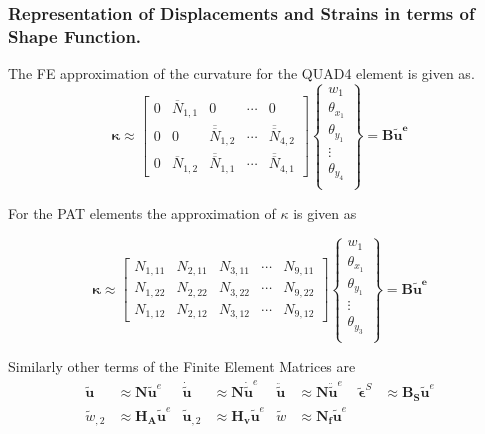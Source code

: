 \documentclass[9pt]{beamer}
\newcommand{\vect}[1]{\boldsymbol{#1}}
\begin{document}
\begin{frame}
\frametitle{Representation of Displacements and Strains in terms of Shape Function.}
The FE approximation of the curvature for the QUAD4 element is given as.
\begin{equation*}\label{eq:kappa}
\vect{ \kappa }  \approx
\begin{bmatrix}
0 & \overline{N}_{1,1} & 0 & \cdots & 0 \\
0&  0 & \overline{\overline{N}}_{1,2}  & \cdots & \overline{\overline{N}}_{4,2} 
\\
0&  \overline{N}_{1,2} & \overline{\overline{N}}_{1,1}  & \cdots & \overline{\overline{N}}_{4,1} 
\end{bmatrix} 
\left\{
\begin{array}{r}
w_1 \\
\theta_{x_1} \\
\theta_{y_1} \\
\vdots \\
\theta_{y_{4}} \\
\end{array} \right\}=\mathbf{ B } \mathbf{\tilde{u}^e}
\end{equation*}


For the PAT elements the approximation of $\kappa$ is given as


\begin{equation*}\label{eq:kappa_KR}
\vect{ \kappa }   \approx
\begin{bmatrix}
N_{1,11} & N_{2,11} & N_{3,11} & \cdots & N_{9,11} \\
N_{1,22} & N_{2,22} & N_{3,22} & \cdots & N_{9,22} \\
N_{1,12} & N_{2,12} & N_{3,12} & \cdots & N_{9,12} 
\end{bmatrix} 
\left\{
\begin{array}{r}
w_1 \\
\theta_{x_1} \\
\theta_{y_1} \\
\vdots \\
\theta_{y_{3}} \\
\end{array} \right\}=\mathbf{ B } \mathbf{\tilde{u}^e}
\end{equation*}


 
Similarly other terms of the Finite Element Matrices are
\begin{align*}
\tilde{ \mathbf{ u}}  & \approx  \mathbf{N}  \tilde{\mathbf{u}}^e
&
\dot{\tilde{ \mathbf{ u}} } & \approx  \mathbf{N}  \dot{\tilde{\mathbf{u}}}^e
&  
\ddot{\tilde{ \mathbf{ u}} } &  \approx   \mathbf{N}  \ddot{\tilde{\mathbf{u}}}^e
&
\tilde{\mathbf{\epsilon}}^S  & \approx  \mathbf{ B_S }\tilde{\mathbf{u}}^e
\\
\tilde{w}_{, 2}  & \approx  \mathbf{ H_A }\tilde{\mathbf{u}}^e
&
\tilde{ \mathbf{ u}}_{,2}  & \approx  \mathbf{ H_v }\tilde{\mathbf{u}}^e
&
\tilde{w}  & \approx  \mathbf{ N_f }\tilde{\mathbf{u}}^e
\end{align*}
\end{frame}
\end{document}

